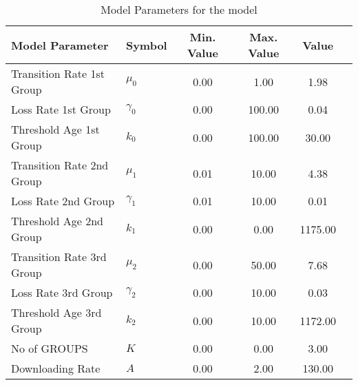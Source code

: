 \begin{table}
\centering
\begin{tabular}{p{5cm}lcccc}
{\bf Model Parameter} & {\bf Symbol} & {\bf Min. Value} & {\bf Max. Value} & {\bf Value}\\
\hline\hline
Transition Rate 1st Group & $\mu_0$ & 0.00 & 1.00 & 1.98\\
Loss Rate 1st Group & $\gamma_0$ & 0.00 & 100.00 & 0.04\\
Threshold Age 1st Group & $k_0$ & 0.00 & 100.00 & 30.00\\
Transition Rate 2nd Group & $\mu_1$ & 0.01 & 10.00 & 4.38\\
Loss Rate 2nd Group & $\gamma_1$ & 0.01 & 10.00 & 0.01\\
Threshold Age 2nd Group & $k_1$ & 0.00 & 0.00 & 1175.00\\
Transition Rate 3rd Group & $\mu_2$ & 0.00 & 50.00 & 7.68\\
Loss Rate 3rd Group & $\gamma_2$ & 0.00 & 10.00 & 0.03\\
Threshold Age 3rd Group & $k_2$ & 0.00 & 10.00 & 1172.00\\
No of GROUPS & $K$ & 0.00 & 0.00 & 3.00\\
Downloading Rate & $A$ & 0.00 & 2.00 & 130.00\\
\hline\hline
\end{tabular}
\caption{Model Parameters for the model}
\end{table}
